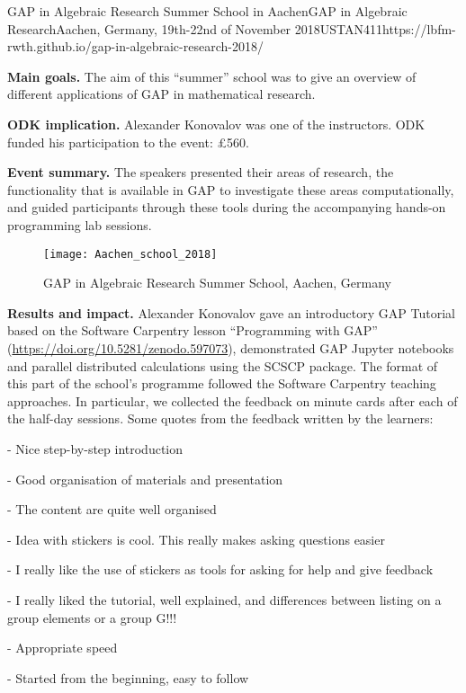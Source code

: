 \begin{event}{GAP in Algebraic Research Summer School in Aachen}{GAP in Algebraic Research}{Aachen, Germany, 19th-22nd of November 2018}{USTAN}{41}{1}{https://lbfm-rwth.github.io/gap-in-algebraic-research-2018/}

\textbf{Main goals.} The aim of this ``summer'' school was 
to give an overview of different applications of GAP in mathematical research. 

\textbf{ODK implication.} Alexander Konovalov was one of the instructors. 
ODK funded his participation to the event: \pounds 560.

\textbf{Event summary.} The speakers presented their areas of research, 
the functionality that is available in GAP to investigate these areas 
computationally, and guided participants through these tools during the 
accompanying hands-on programming lab sessions.

\begin{figure}[ht]
  \texttt{[image: Aachen\_school\_2018]}
  \caption*{GAP in Algebraic Research Summer School, Aachen, Germany}
\end{figure}

\textbf{Results and impact.} Alexander Konovalov
gave an introductory GAP Tutorial based on the 
Software Carpentry lesson ``Programming with GAP''
(\url{https://doi.org/10.5281/zenodo.597073}),
demonstrated GAP Jupyter notebooks and parallel 
distributed calculations using the SCSCP package.
The format of this part of the school's programme
followed the Software Carpentry teaching approaches.
In particular, we collected the feedback on minute
cards after each of the half-day sessions. Some quotes
from the feedback written by the learners:

- Nice step-by-step introduction

- Good organisation of materials and presentation

- The content are quite well organised 

- Idea with stickers is cool. This really makes asking questions easier

- I really like the use of stickers as tools for asking for help and give feedback

- I really liked the tutorial, well explained, and differences between listing on a group elements or a group G!!!

- Appropriate speed

- Started from the beginning, easy to follow


\end{event}
